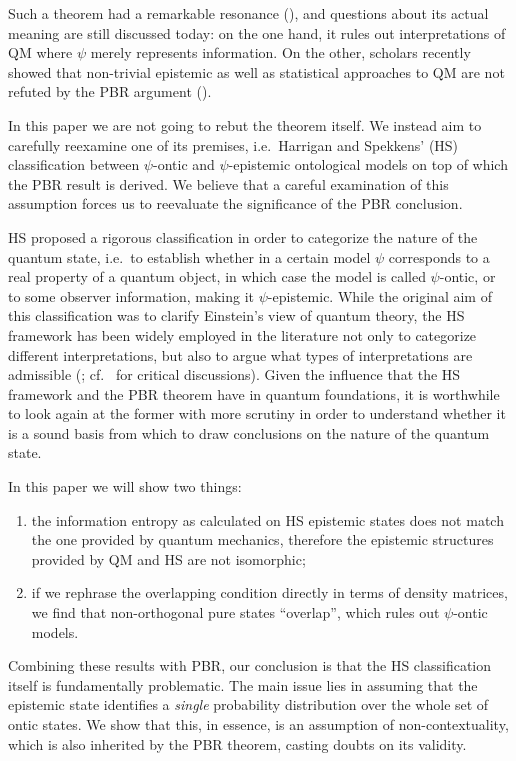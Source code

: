 \documentclass[twocolumn,prl,floatfix,superscriptaddress]{revtex4-2}
\begin{document}
Such a theorem had a remarkable resonance (\cite{Leifer:2014, Leifer:2014b, Renner:2012, Colbeck:2017, Hardy:2013, Maroney:2014, Patra:2013, Mansfield:2016, Schlosshauer:2012, Schlosshauer:2013, Schlosshauer:2014, Aaronson:2013}), and questions about its actual meaning are still discussed today: on the one hand, it rules out interpretations of QM where $\psi$ merely represents information. On the other, scholars recently showed that non-trivial epistemic as well as statistical approaches to QM are not refuted by the PBR argument (\cite{Ben:2017, Rizzi:2018, Oldofredi:2021, DeBrota:2019}).
	
In this paper we are not going to rebut the theorem itself. We instead aim to carefully reexamine one of its premises, i.e.\ Harrigan and Spekkens' (HS) classification between $\psi$-ontic and $\psi$-epistemic ontological models  \cite{Harrigan:2010} on top of which the PBR result is derived. We believe that a careful examination of this assumption forces us to reevaluate the significance of the PBR conclusion. 
		
HS proposed a rigorous classification in order to categorize the nature of the quantum state, i.e.\ to establish whether in a certain model $\psi$ corresponds to a real property of a quantum object, in which case the model is called $\psi$-ontic, or to some observer information, making it $\psi$-epistemic. While the original aim of this classification was to clarify Einstein's view of quantum theory, the HS framework has been widely employed in the literature not only to categorize different interpretations, but also to argue what types of interpretations are admissible (\cite{Leifer:2013, Leifer:2017, Branciard:2014, Hermens:2021, Wood:2015, Ringbauer:2015, Mazurek:2016, Bartlett:2012}; cf.\ \cite{Oldofredi:2020b, Lewis:2012, Ladyman:2021} for critical discussions). Given the influence that the HS framework and the PBR theorem have in quantum foundations, it is worthwhile to look again at the former with more scrutiny in order to understand whether it is a sound basis from which to draw conclusions on the nature of the quantum state.

In this paper we will show two things:
\begin{enumerate}
	\item the information entropy as calculated on HS epistemic states does not match the one provided by quantum mechanics, therefore the epistemic structures provided by QM and HS are not isomorphic;
	\item if we rephrase the overlapping condition directly in terms of density matrices, we find that non-orthogonal pure states ``overlap'', which rules out $\psi$-ontic models.
\end{enumerate}
Combining these results with PBR, our conclusion is that the HS classification itself is fundamentally problematic. The main issue lies in assuming that the epistemic state identifies a \emph{single} probability distribution over the whole set of ontic states. We show that this, in essence, is an assumption of non-contextuality, which is also inherited by the PBR theorem, casting doubts on its validity.
\end{document}

